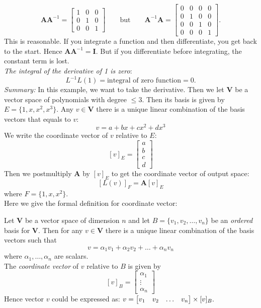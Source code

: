 \[
\bm A\bm A^{-1}=\begin{bmatrix}
1&0&0\\0&1&0\\0&0&1
\end{bmatrix}\qquad\text{but}\qquad\bm A^{-1}\bm A=\begin{bmatrix}
0&0&0&0\\0&1&0&0\\0&0&1&0\\0&0&0&1
\end{bmatrix}.
\]
This is reasonable. If you integrate a function and then differentiate, you get back to the start. Hence $\bm A\bm A^{-1}=\bm I$. But if you differentiate before integrating, the constant term is lost.\\ \emph{The integral of the derivative of 1 is zero}:
\[
L^{-1}L(1)=\text{integral of zero function}=0.
\]
\emph{Summary: }In this example, we want to take the derivative. Then we let $\bm V$ be a vector space of polynomials with degree $\le 3$. Then its basis is given by $E=\{1,x,x^2,x^3\}$. Any $v\in\bm V$ there is a unique linear combination of the basis vectors that equals to $v$:
\[
v=a+bx+cx^2+dx^3
\]
We write the coordinate vector of $v$ relative to $E$:
\[
[v]_{E}=\begin{bmatrix}
a\\b\\c\\d
\end{bmatrix}
\]
Then we postmultiply $\bm A$ by $[v]_{E}$ to get the coordinate vector of output space:
\[
[L(v)]_{F}=\bm A[v]_{E}
\]
where $F=\{1,x,x^2\}$.\\
Here we give the formal definition for coordinate vector:
\enlargethispage{2cm}
\begin{definition}
Let $\bm V$ be a vector space of dimension $n$ and let $B=\{v_1,v_2,\dots,v_n\}$ be an \emph{ordered} basis for $\bm V$. Then for any $v\in\bm V$ there is a unique linear combination of the basis vectors such that
\[
v=\alpha_1v_1+\alpha_2v_2+\dots+\alpha_nv_n
\]
where $\alpha_1,\dots,\alpha_n$ are scalars.\\
The \emph{coordinate vector} of $v$ relative to $B$ is given by
\[
[v]_{B}=\begin{bmatrix}
\alpha_1\\\vdots\\\alpha_n
\end{bmatrix}
\]
Hence vector $v$ could be expressed as:
$
v=\begin{bmatrix}
v_1&v_2&\dots&v_n
\end{bmatrix}\times [v]_{B}.
$
\end{definition}
